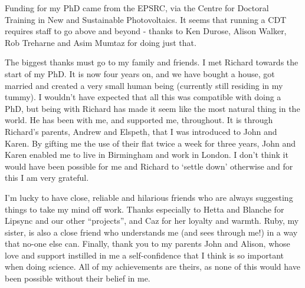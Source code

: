 Funding for my PhD came from the EPSRC, via the Centre for Doctoral Training in New and Sustainable Photovoltaics. It seems that running a CDT requires staff to go above and beyond - thanks to Ken Durose, Alison Walker, Rob Treharne and Asim Mumtaz for doing just that.

The biggest thanks must go to my family and friends. I met Richard towards the start of my PhD. It is now four years on, and we have bought a house, got married and created a very small human being (currently still residing in my tummy). I wouldn't have expected that all this was compatible with doing a PhD, but being with Richard has made it seem like the most natural thing in the world. He has been with me, and supported me, throughout. It is through Richard's parents, Andrew and Elspeth, that I was introduced to John and Karen. By gifting me the use of their flat twice a week for three years, John and Karen enabled me to live in Birmingham and work in London. I don't think it would have been possible for me and Richard to `settle down' otherwise and for this I am very grateful.

I'm lucky to have close, reliable and hilarious friends who are always suggesting things to take my mind off work. Thanks especially to Hetta and Blanche for Lipsync and our other ``projects'', and Caz for her loyalty and warmth. Ruby, my sister, is also a close friend who understands me (and sees through me!) in a way that no-one else can. Finally, thank you to my parents John and Alison, whose love and support instilled in me a self-confidence that I think is so important when doing science. All of my achievements are theirs, as none of this would have been possible without their belief in me.